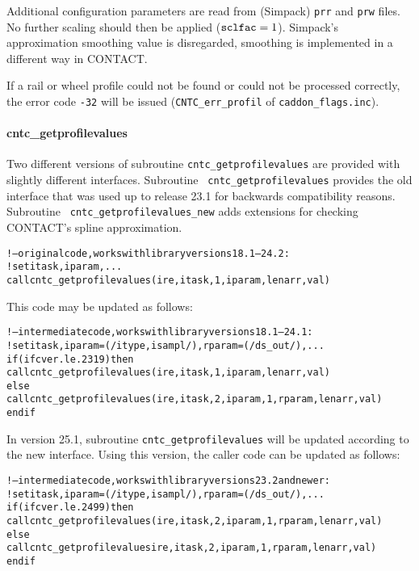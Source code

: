 \documentclass[12pt]{report}
\begin{document}
Additional configuration parameters are read from (Simpack) {\tt prr} and
{\tt prw} files. No further scaling should then be applied (${\tt
sclfac}=1$). Simpack's approximation smoothing value is disregarded,
smoothing is implemented in a different way in CONTACT.

If a rail or wheel profile could not be found or could not be processed
correctly, the error code {\tt -32} will be issued ({\tt CNTC\_err\_profil}
of {\tt caddon\_flags.inc}). 

\paragraph{cntc\_getprofilevalues}

Two different versions of subroutine {\tt cntc\_getprofilevalues} are
provided with slightly different interfaces. Subroutine {\tt
cntc\_getprofilevalues} provides the old interface that was used up
to release 23.1 for backwards compatibility reasons. Subroutine {\tt
cntc\_\-get\-pro\-file\-values\_new} adds extensions for checking
CONTACT's spline approximation.

{\scriptsize\begin{alltt}
!--original code, works with library versions 18.1 -- 24.2:
   ! set itask, iparam, ...
   call cntc_getprofilevalues(ire, itask, 1, iparam, lenarr, val) 
\end{alltt}}

This code may be updated as follows:
{\scriptsize\begin{alltt}
!--intermediate code, works with library versions 18.1 -- 24.1:
   ! set itask, iparam = (/ itype, isampl /), rparam = (/ ds_out /), ...
   if (ifcver.le.2319) then
      call cntc_getprofilevalues(ire, itask, 1, iparam, lenarr, val) 
   else
      call cntc_getprofilevalues(ire, itask, 2, iparam, 1, rparam, lenarr, val) 
   endif
\end{alltt}}

In version 25.1, subroutine {\tt cntc\_getprofilevalues} will be updated
according to the new interface. Using this version, the caller code can be
updated as follows:

{\scriptsize\begin{alltt}
!--intermediate code, works with library versions 23.2 and newer:
   ! set itask, iparam = (/ itype, isampl /), rparam = (/ ds_out /), ...
   if (ifcver.le.2499) then
      call cntc_getprofilevalues(ire, itask, 2, iparam, 1, rparam, lenarr, val) 
   else
      call cntc_getprofilevalues\red{(}ire, itask, 2, iparam, 1, rparam, lenarr, val) 
   endif
\end{alltt}}
\end{document}
